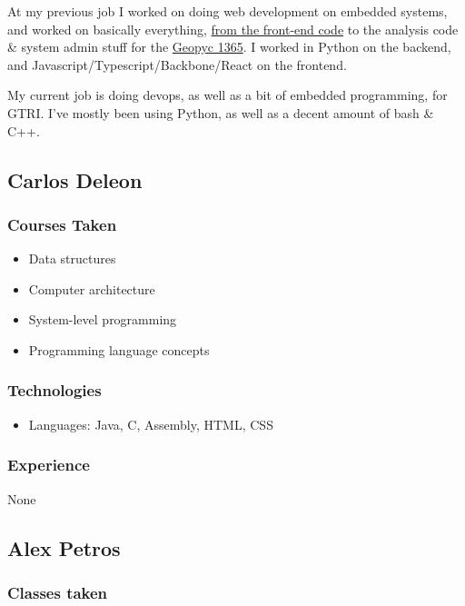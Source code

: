 \documentclass[
10pt, %
letterpaper, %
oneside, %
headinclude,footinclude, %
BCOR5mm, %
]{scrartcl}
\begin{document}
At my previous job I worked on doing web development on embedded
systems, and worked on basically everything,
\href{https://www.micromeritics.com/Repository/Files/Envelope-Density-Report.jpg}{from
the front-end code} to the analysis code \& system admin stuff for the
\href{https://www.youtube.com/watch?v=TdUiYWuejVI}{Geopyc 1365}. I
worked in Python on the backend, and
Javascript/Typescript/Backbone/React on the frontend.

My current job is doing devops, as well as a bit of embedded
programming, for GTRI\@. I've mostly been using Python, as well as a
decent amount of bash \& C++.

\subsection{Carlos Deleon}

\subsubsection{Courses Taken}

\begin{itemize}
\item
  Data structures
\item
  Computer architecture
\item
  System-level programming
\item
  Programming language concepts
\end{itemize}

\subsubsection{Technologies}

\begin{itemize}
\item
  Languages: Java, C, Assembly, HTML, CSS
\end{itemize}

\subsubsection{Experience}

None

\subsection{Alex Petros}

\subsubsection{Classes taken}
\end{document}
